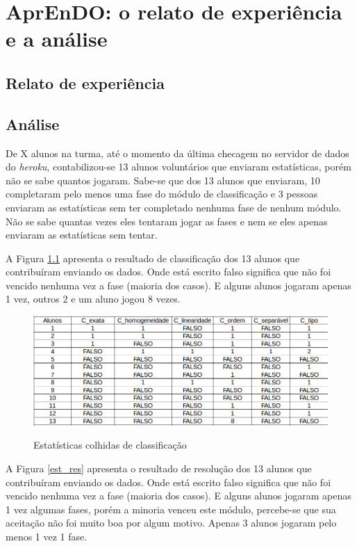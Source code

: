 \chapter[AprEnDO: o relato de experiência e a análise]{AprEnDO: o relato de experiência e a análise}
\section[Relato de experiência]{Relato de experiência}

\section[Análise]{Análise}

De X alunos na turma, até o momento da última checagem no servidor de dados do \textit{heroku}, contabilizou-se 13 alunos voluntários que enviaram estatísticas, porém não se sabe quantos jogaram. Sabe-se que dos 13 alunos que enviaram, 10 completaram pelo menos uma fase do módulo de classificação e 3 pessoas enviaram as estatísticas sem ter completado nenhuma fase de nenhum módulo. Não se sabe quantas vezes eles tentaram jogar as fases e nem se eles apenas enviaram as estatísticas sem tentar. 

A Figura \ref{est_cla} apresenta o resultado de classificação dos 13 alunos que contribuíram enviando os dados. Onde está escrito falso significa que não foi vencido nenhuma vez a fase (maioria dos casos). E alguns alunos jogaram apenas 1 vez, outros 2 e um aluno jogou 8 vezes.

\begin{figure}[H]
\centering
\caption{Estatísticas colhidas de classificação}
\includegraphics[scale=0.5]{figuras/estatisticas/estatisticas_classificacao.png}
\label{est_cla}
\end{figure}


A Figura \ref{est_res} apresenta o resultado de resolução dos 13 alunos que contribuíram enviando os dados. Onde está escrito falso significa que não foi vencido nenhuma vez a fase (maioria dos casos). E alguns alunos jogaram apenas 1 vez algumas fases, porém a minoria venceu este módulo, percebe-se que sua aceitação não foi muito boa por algum motivo. Apenas 3 alunos jogaram pelo menos 1 vez 1 fase.

